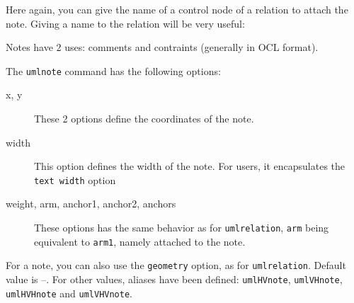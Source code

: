 \documentclass[a4paper,11pt]{report}
\begin{document}
\medskip

Here again, you can give the name of a control node of a relation to attach the note. Giving a name to the relation will be very useful:

\medskip

\begin{minipage}{0.6\textwidth}

\end{minipage}
\begin{minipage}{0.4\textwidth}
\begin{center}
\end{center}
\end{minipage}

\medskip

\medskip

Notes have 2 uses: comments and contraints (generally in OCL format).

\medskip

The {\tt umlnote} command has the following options:

\begin{description}
\item[x, y] These 2 options define the coordinates of the note.
\item[width] This option defines the width of the note. For \TikZ users, it encapsulates the {\tt text width} option
\item[weight, arm, anchor1, anchor2, anchors] These options has the same behavior as for {\tt umlrelation}, {\tt arm} being equivalent to {\tt arm1}, namely attached to the note.
\end{description}

\medskip

\begin{minipage}{0.6\textwidth}

\end{minipage}
\begin{minipage}{0.4\textwidth}
\begin{center}
\end{center}
\end{minipage}

\medskip

\medskip

For a note, you can also use the {\tt geometry} option, as for {\tt umlrelation}. Default value is --. For other values, aliases have been defined: {\tt umlHVnote}, {\tt umlVHnote}, {\tt umlHVHnote} and {\tt umlVHVnote}.
\end{document}
